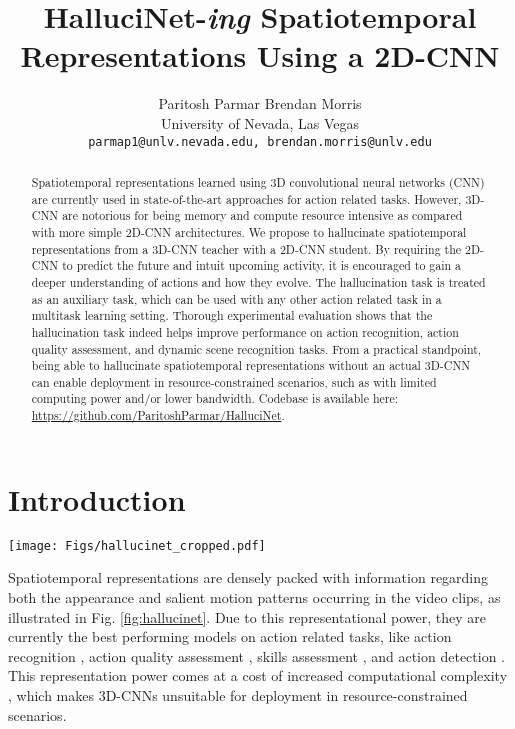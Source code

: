 \documentclass[10pt,twocolumn,letterpaper]{article}
\begin{document}
\title{HalluciNet-\textit{ing} Spatiotemporal Representations Using a 2D-CNN}

\author{Paritosh Parmar \hspace{2cm} Brendan Morris\\
University of Nevada, Las Vegas\\
{\tt\small parmap1@unlv.nevada.edu, brendan.morris@unlv.edu}
}

\maketitle


\begin{abstract}
Spatiotemporal representations learned using 3D convolutional neural networks (CNN) are currently used in state-of-the-art approaches for action related tasks. However, 3D-CNN are notorious for being memory and compute resource intensive as compared with more simple 2D-CNN architectures. We propose to hallucinate spatiotemporal representations from a 3D-CNN teacher with a 2D-CNN student.  By requiring the 2D-CNN to predict the future and intuit upcoming activity, it is encouraged to gain a deeper understanding of actions and how they evolve.  The hallucination task is treated as an auxiliary task, which can be used with any other action related task in a multitask learning setting.  Thorough experimental evaluation shows that the hallucination task indeed helps improve performance on action recognition, action quality assessment, and dynamic scene recognition tasks. From a practical standpoint, being able to hallucinate spatiotemporal representations without an actual 3D-CNN can enable deployment in resource-constrained scenarios, such as with limited computing power and/or lower bandwidth. Codebase is available here: \url{https://github.com/ParitoshParmar/HalluciNet}.
\end{abstract} \section{Introduction}
\begin{figure*}
    \centering
    \texttt{[image: Figs/hallucinet\_cropped.pdf]}
    \caption{\textbf{Multitask leaning with HalluciNet.} HalluciNet (2D-CNN) is jointly optimized for main task, and to hallucinate spatiotemporal features (computed by an actual 3D-CNN) from a single frame.}
    \label{fig:hallucinet}
\end{figure*}

Spatiotemporal representations are densely packed with information regarding both the appearance and salient motion patterns occurring in the video clips, as illustrated in Fig. \ref{fig:hallucinet}. Due to this representational power, they are currently the best performing models on action related tasks, like action recognition \cite{c3d, kinetics, kensho, slowfast}, action quality assessment \cite{ltsoe, mtlaqa}, skills assessment \cite{doughty19}, and action detection \cite{ghanem2018activitynet}. This representation power comes at a cost of increased computational complexity \cite{mict, lightweight_wang, rgbd_zhang, characterizing_merck}, which makes 3D-CNNs unsuitable for deployment in resource-constrained scenarios.
\end{document}
